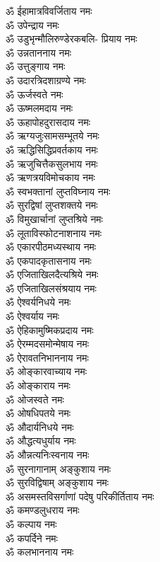 \begin{multicols}{2}
\begin{flushleft}
ॐ ईहामात्रविवर्जिताय नमः\\
ॐ उपेन्द्राय नमः\\
ॐ उडुभृन्मौलिरुण्डेरकबलि- प्रियाय नमः\\
ॐ उन्नताननाय नमः\\
ॐ उत्तुङ्गाय नमः\\
ॐ उदारत्रिदशाग्रण्ये नमः\\
ॐ ऊर्जस्वते नमः\\
ॐ ऊष्मलमदाय नमः\\
ॐ ऊहापोहदुरासदाय नमः\\
ॐ ऋग्यजुःसामसम्भूतये नमः\hfill{}\\
ॐ ऋद्धिसिद्धिप्रवर्तकाय नमः\\
ॐ ऋजुचित्तैकसुलभाय नमः\\
ॐ ऋणत्रयविमोचकाय नमः\\
ॐ स्वभक्तानां लुप्तविघ्नाय नमः\\
ॐ सुरद्विषां लुप्तशक्तये नमः\\
ॐ विमुखार्चानां लुप्तश्रिये नमः\\
ॐ लूताविस्फोटनाशनाय नमः\\
ॐ एकारपीठमध्यस्थाय नमः\\
ॐ एकपादकृतासनाय नमः\\
ॐ एजिताखिलदैत्यश्रिये नमः\hfill{}\\
ॐ एजिताखिलसंश्रयाय नमः\\
ॐ ऐश्वर्यनिधये नमः\\
ॐ ऐश्वर्याय नमः\\
ॐ ऐहिकामुष्मिकप्रदाय नमः\\
ॐ ऐरम्मदसमोन्मेषाय नमः\\
ॐ ऐरावतनिभाननाय नमः\\
ॐ ओङ्कारवाच्याय नमः\\
ॐ ओङ्काराय नमः\\
ॐ ओजस्वते नमः\\
ॐ ओषधिपतये नमः\hfill{}\\
ॐ औदार्यनिधये नमः\\
ॐ औद्धत्यधुर्याय नमः\\
ॐ औन्नत्यनिःस्वनाय नमः\\
ॐ सुरनागानाम् अङ्कुशाय नमः\\
ॐ सुरविद्विषाम् अङ्कुशाय नमः\\
ॐ असमस्तविसर्गाणां पदेषु परिकीर्तिताय नमः\\
ॐ कमण्डलुधराय नमः\\
ॐ कल्पाय नमः\\
ॐ कपर्दिने नमः\\
ॐ कलभाननाय नमः\hfill{}\\

\end{flushleft}
\end{multicols}
